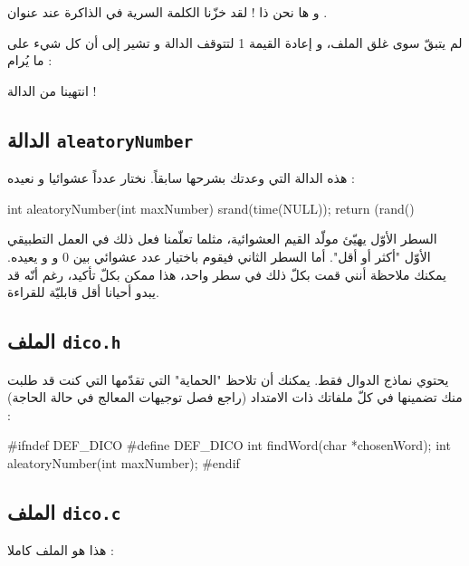 و ها نحن ذا ! لقد خزّنا الكلمة السرية في الذاكرة عند عنوان
.

لم يتبقّ سوى غلق الملف، و إعادة القيمة 1 لتتوقف الدالة و تشير إلى أن كل شيء على ما يُرام :

\begin{Csource}
  fclose(dico);
  return 1; // Everything is okay, return 1
}
\end{Csource}
انتهينا من الدالة
 !

\subsection{الدالة
\texttt{aleatoryNumber}}
هذه الدالة التي وعدتك بشرحها سابقاً. نختار عدداً عشوائيا و نعيده :

\begin{Csource}
int aleatoryNumber(int maxNumber)
{
    srand(time(NULL));
    return (rand() %
}
\end{Csource}

السطر الأوّل يهيّئ مولّد القيم العشوائية، مثلما تعلّمنا فعل ذلك في العمل التطبيقي الأوّل "أكثر أو أقل". أما السطر الثاني فيقوم باختيار عدد عشوائي بين $ 0 $
و
و يعيده. يمكنك ملاحظة أنني قمت بكلّ ذلك في سطر واحد، هذا ممكن بكلّ تأكيد، رغم أنّه قد يبدو أحيانا أقل قابليّة للقراءة.

\subsection{الملف \texttt{dico.h}}

يحتوي نماذج الدوال فقط. يمكنك أن تلاحظ "الحماية" التي تقدّمها
التي كنت قد طلبت منك تضمينها في كلّ ملفاتك ذات الامتداد
(راجع فصل توجيهات المعالج في حالة الحاجة) :

\begin{Csource}
#ifndef DEF_DICO
#define DEF_DICO
int findWord(char *chosenWord);
int aleatoryNumber(int maxNumber);
#endif
\end{Csource}

\subsection{الملف \texttt{dico.c}}

هذا هو الملف
كاملا :

